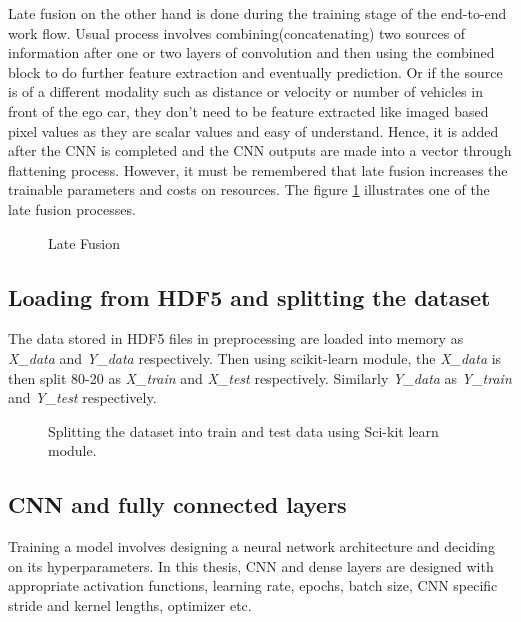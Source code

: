 Late fusion on the other hand is done during the training stage of the end-to-end work
flow. Usual process involves combining(concatenating) two sources of information after one
or two layers of convolution and then using the combined block to do further feature
extraction and eventually prediction. Or if the source is of a different modality such as
distance or velocity or number of vehicles in front of the ego car, they don't need to be
feature extracted like imaged based pixel values as they are scalar values and easy of
understand. Hence, it is added after the CNN is completed and the CNN outputs are made
into a vector through flattening process. However, it must be remembered that late fusion increases the
trainable parameters and costs on resources. The figure \ref{fig:latefusion} illustrates
one of the late fusion processes.

\begin{figure}[h]
    \centering
    \def\svgwidth{\textwidth}
    
    \caption{Late Fusion}
    \label{fig:latefusion}
\end{figure}


\subsection{Loading from HDF5 and splitting the dataset}
The data stored in HDF5 files in preprocessing are loaded into memory as \textit{X\_data} and
\textit{Y\_data} respectively. Then using scikit-learn module, the \textit{X\_data} is then split 80-20
as \textit{X\_train} and \textit{X\_test} respectively. Similarly \textit{Y\_data} as \textit{Y\_train} and
\textit{Y\_test} respectively.

\begin{wrapfigure}{l}{0.3\textwidth}
	\centering
    \def\svgwidth{0.3\textwidth}
    \caption{Splitting the dataset into train and test data using Sci-kit learn module.}
    \label{fig:splitdata}
\end{wrapfigure}

\subsection{CNN and fully connected layers}

Training a model involves designing a neural network architecture and deciding on its
hyperparameters. In this thesis, CNN and dense layers are designed with appropriate
activation functions, learning rate, epochs, batch size, CNN specific stride and kernel
lengths, optimizer etc.

